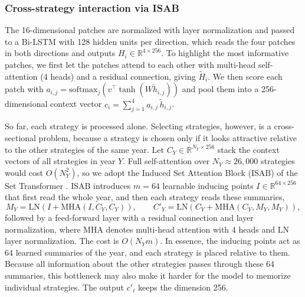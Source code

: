 \documentclass[pdflatex,sn-mathphys-num]{sn-jnl}%
\theoremstyle{thmstyleone}%
\theoremstyle{thmstyletwo}%
\theoremstyle{thmstylethree}%
\begin{document}
\subsubsection{Cross-strategy interaction via ISAB}\label{subsubModel4}
The 16-dimensional patches are normalized with layer normalization \cite{ba2016layer} and passed to a Bi-LSTM \cite{hochreiter1997long, schuster1997bidirectional} with 128 hidden units per direction, which reads the four patches in both directions and outputs $H_i \in \mathbb{R}^{4 \times 256}$. To highlight the most informative patches, we first let the patches attend to each other with multi-head self-attention \cite{vaswani2017attention} (4 heads) and a residual connection, giving $\tilde{H}_i$. We then score each patch with $a_{i,j} = \mathrm{softmax}_j\!\left(v^{\top}\tanh(W \tilde{h}_{i,j})\right)$ and pool them into a 256-dimensional context vector $c_i = \sum_{j=1}^{4} a_{i,j}\, \tilde{h}_{i,j}$.

So far, each strategy is processed alone. Selecting strategies, however, is a cross-sectional problem, because a strategy is chosen only if it looks attractive relative to the other strategies of the same year. Let $C_Y \in \mathbb{R}^{N_Y \times 256}$ stack the context vectors of all strategies in year $Y$. Full self-attention over $N_Y \approx 26{,}000$ strategies would cost $O(N_Y^2)$, so we adopt the Induced Set Attention Block (ISAB) of the Set Transformer \cite{lee2019set}. ISAB introduces $m = 64$ learnable inducing points $I \in \mathbb{R}^{64 \times 256}$ that first read the whole year, and then each strategy reads these summaries,
\begin{equation}
M_Y = \mathrm{LN}\!\left(I + \mathrm{MHA}(I, C_Y, C_Y)\right), \qquad
C'_Y = \mathrm{LN}\!\left(C_Y + \mathrm{MHA}(C_Y, M_Y, M_Y)\right),
\label{eq:isab}
\end{equation}
followed by a feed-forward layer with a residual connection and layer normalization, where $\mathrm{MHA}$ denotes multi-head attention with 4 heads and $\mathrm{LN}$ layer normalization. The cost is $O(N_Y m)$. In essence, the inducing points act as 64 learned summaries of the year, and each strategy is placed relative to them. Because all information about the other strategies passes through these 64 summaries, this bottleneck may also make it harder for the model to memorize individual strategies. The output $c'_i$ keeps the dimension 256.
\end{document}
